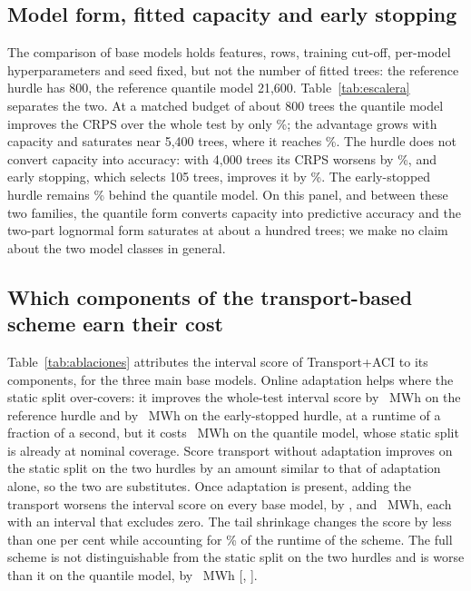 \subsection{Model form, fitted capacity and early stopping}
\label{sec:escalera}

The comparison of base models holds features, rows, training cut-off, per-model hyperparameters and seed fixed, but not the number of fitted trees: the reference hurdle has 800, the reference quantile model 21{,}600. Table~\ref{tab:escalera} separates the two. At a matched budget of about 800 trees the quantile model improves the CRPS over the whole test by only \%; the advantage grows with capacity and saturates near 5{,}400 trees, where it reaches \%. The hurdle does not convert capacity into accuracy: with 4{,}000 trees its CRPS worsens by \%, and early stopping, which selects 105 trees, improves it by \%. The early-stopped hurdle remains \% behind the quantile model. On this panel, and between these two families, the quantile form converts capacity into predictive accuracy and the two-part lognormal form saturates at about a hundred trees; we make no claim about the two model classes in general.



\subsection{Which components of the transport-based scheme earn their cost}
\label{sec:ablaciones}

Table~\ref{tab:ablaciones} attributes the interval score of Transport+ACI to its components, for the three main base models. Online adaptation helps where the static split over-covers: it improves the whole-test interval score by ~MWh on the reference hurdle and by ~MWh on the early-stopped hurdle, at a runtime of a fraction of a second, but it costs ~MWh on the quantile model, whose static split is already at nominal coverage. Score transport without adaptation improves on the static split on the two hurdles by an amount similar to that of adaptation alone, so the two are substitutes. Once adaptation is present, adding the transport worsens the interval score on every base model, by ,  and ~MWh, each with an interval that excludes zero. The tail shrinkage changes the score by less than one per cent while accounting for \% of the runtime of the scheme. The full scheme is not distinguishable from the static split on the two hurdles and is worse than it on the quantile model, by ~MWh [, ].

